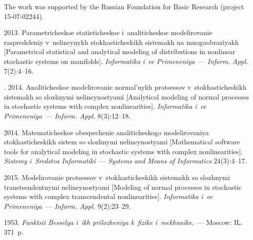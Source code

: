 \Ack
    \noindent
The work was supported by the Russian Foundation for Basic Research (project 15-07-02244).




  \begin{multicols}{2}

\renewcommand{\bibname}{\protect\rmfamily References}



{\small\frenchspacing
 {%
 \begin{thebibliography}{99}



 2013.
Parametricheskoe statisticheskoe i~analiticheskoe modelirovanie raspredeleniy 
v~nelineynykh stokhasticheskikh sistemakh na mno\-go\-ob\-ra\-zi\-yakh
[Parametrical statistical and analytical modeling of distributions 
in nonlinear stochastic systems on manifolds].
\textit{Informatika i~ee Primeneniya}~--- \textit{Inform. Appl.} 7(2):4--16.

.
2014.
Analiticheskoe modelirovanie normal'nykh protsessov 
v~sto\-kha\-sti\-che\-skikh sistemakh so slozhnymi nelineynostyami
[Analytical modeling of normal processes in stochastic systems with complex nonlinearities].
\textit{Informatika i~ee Primeneniya}~--- \textit{Inform. Appl.}  8(3):12--18.

 2014.
Matematicheskoe obespechenie analiticheskogo modelirovaniya stokhasticheskikh 
sistem so slozhnymi nelineynostyami
[Mathematical software tools for analytical modeling 
in stochastic systems with complex nonlinearities]. 
\textit{Sistemy i~Sredstva Informatiki}~---
\textit{Systems and Means of Informatics} 24(3):4--17.

 2015.
Modelirovanie protsessov v~stokhasticheskikh sistemakh so slozhnymi 
transtsendentnymi nelineynostyami
[Modeling of normal processes in stochastic systems with 
complex transcendental  nonlinearities]. \textit{Informatika i~ee Primeneniya}~---
\textit{Inform. Appl.} 9(2):23--29.

 1953.
\textit{Funktsii Besselya i~ikh prilozheniya k~fizike i~mekhanike}.~--- 
Moscow: IL. 371~p.


\end{thebibliography}}}
\end{multicols}

